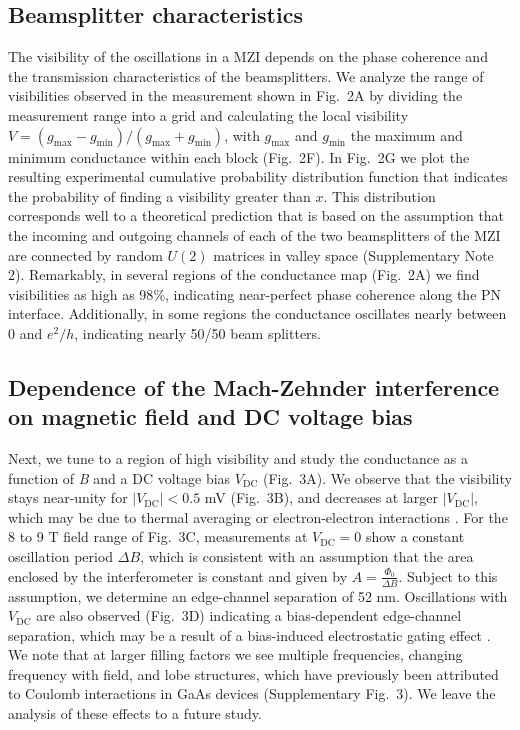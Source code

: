 \documentclass[%
reprint,amsmath,amssymb,aps,prl,superscriptaddress,
twocolumn
]{revtex4-1}
\begin{document}
	\subsection{Beamsplitter characteristics}
	The visibility of the oscillations in a MZI depends on the phase coherence and the transmission characteristics of the beamsplitters.  We analyze the range of visibilities observed in the measurement shown in Fig.~2A by dividing the measurement range into a grid and calculating the local visibility $V=(g_\mathrm{max}-g_\mathrm{min})/(g_\mathrm{max}+g_\mathrm{min})$, with $g_\mathrm{max}$ and $g_\mathrm{min}$ the maximum and minimum conductance within each block (Fig.~2F). In Fig.~2G we plot the resulting experimental cumulative probability distribution function that indicates the probability of finding a visibility greater than $x$. This distribution corresponds well to a theoretical prediction that is based on the assumption that the incoming and outgoing channels of each of the two beamsplitters of the MZI are connected by random $U(2)$ matrices in valley space (Supplementary Note 2). Remarkably, in several regions of the conductance map (Fig.~2A) we find visibilities as high as 98$\%$, indicating near-perfect phase coherence along the PN interface. Additionally, in some regions the conductance oscillates nearly between 0 and $e^2/h$, indicating nearly 50/50 beam splitters.
	\subsection{Dependence of the Mach-Zehnder interference on magnetic field and DC voltage bias}
	Next, we tune to a region of high visibility and study the conductance as a function of \emph{B} and a DC voltage bias $V_\mathrm{DC}$ (Fig.~3A). We observe that the visibility stays near-unity for $|V_\mathrm{DC}|<0.5$ mV (Fig.~3B), and decreases at larger $|V_\mathrm{DC}|$, which may be due to thermal averaging or electron-electron interactions \cite{Ji2003, Bieri2009}. For the 8 to 9 T field range of Fig.~3C, measurements at $V_\mathrm{DC}=0$ show a constant oscillation period $\Delta B$, which is consistent with an assumption that the area enclosed by the interferometer is constant and given by $A=\frac{\Phi_0}{\Delta B}$. Subject to this assumption, we determine an edge-channel separation of 52 nm. Oscillations with $V_\mathrm{DC}$ are also observed (Fig.~3D) indicating a bias-dependent edge-channel separation, which may be a result of a bias-induced electrostatic gating effect \cite{Bieri2009}. We note that at larger filling factors we see multiple frequencies, changing frequency with field, and lobe structures, which have previously been attributed to Coulomb interactions in GaAs devices \cite{Neder2006, Roulleau2007,Bieri2009} (Supplementary Fig.~3). We leave the analysis of these effects to a future study.
		
\end{document}
